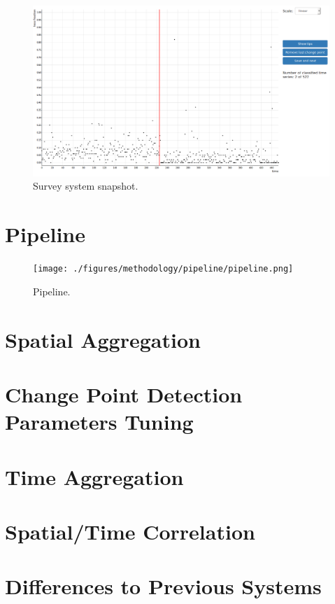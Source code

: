 \begin{figure}[H]
    \centering
    \includegraphics[width=0.9\linewidth]{./figures/methodology/supervised_learning_try/survey_system.png}
    \caption{Survey system snapshot.}
\label{fig:survey_system}
\end{figure}%

\section{Pipeline}

\begin{figure}[H]
    \centering
    \texttt{[image: ./figures/methodology/pipeline/pipeline.png]}
    \caption{Pipeline.}
\label{fig:survey_system}
\end{figure}%

\section{Spatial Aggregation}
\section{Change Point Detection Parameters Tuning}
\section{Time Aggregation}
\section{Spatial/Time Correlation}
\section{Differences to Previous Systems}
